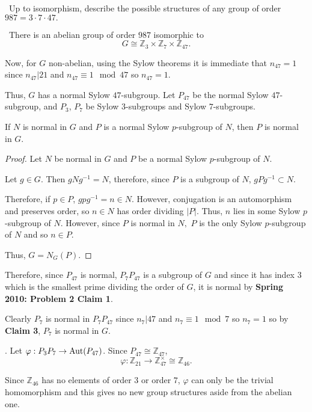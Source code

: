 \documentclass[12pt]{Qual}
\begin{document}
\begin{problem} $\,$
Up to isomorphism, describe the possible structures of any group of order $987=3\cdot 7\cdot 47.$
\end{problem}


\begin{solution}$\,$
 There is an abelian group of order $987$ isomorphic to $$G\cong\mathbb{Z}_3\times\mathbb{Z}_7\times\mathbb{Z}_{47}.$$

Now, for $G$ non-abelian, using the Sylow theorems it is immediate that $n_{47}=1$ since $n_{47}|21$ and $n_{47}\equiv 1\mod 47$ so $n_{47}=1$.

Thus, $G$ has a normal Sylow $47$-subgroup. Let $P_{47}$ be the normal Sylow $47$-subgroup, and $P_3$, $P_7$ be Sylow $3$-subgroups and Sylow $7$-subgroups.

\begin{claim} If $N$ is normal in $G$ and $P$ is a normal Sylow $p$-subgroup of $N$, then $P$ is normal in $G$.
\begin{proof} Let $N$ be normal in $G$ and $P$ be a normal Sylow $p$-subgroup of $N$.

Let $g\in G$. Then $gNg^{-1}=N$, therefore, since $P$ is a subgroup of $N$, $gPg^{-1}\subset N$.

Therefore, if $p\in P$, $gpg^{-1}=n\in N$. However, conjugation is an automorphism and preserves order, so $n\in N$ has order dividing $|P|$. Thus, $n$ lies in some Sylow $p$-subgroup of $N.$ However, since $P$ is normal in $N,$ $P$ is the only Sylow $p$-subgroup of $N$ and so $n\in P$.

Thus, $G=N_G(P)$.
\end{proof}
\end{claim}

Therefore, since $P_{47}$ is normal, $P_7P_{47}$ is a subgroup of $G$ and since it has index $3$ which is the smallest prime dividing the order of $G$, it is normal by \textbf{Spring 2010: Problem 2 Claim 1}.

Clearly $P_7$ is normal in $P_7P_{47}$ since $n_7|47$ and $n_7\equiv 1\mod 7$ so $n_7=1$ so by \textbf{Claim 3}, $P_7$ is normal in $G.$

. Let $\varphi:P_3P_7\to\text{Aut}(P_{47})$. Since $P_{47}\cong\mathbb{Z}_{47}$, $$\varphi:\mathbb{Z}_{21}\to\mathbb{Z}_{47}^\times\cong\mathbb{Z}_{46}.$$

Since $\mathbb{Z}_{46}$ has no elements of order $3$ or order $7$, $\varphi$ can only be the trivial homomorphism and this gives no new group structures aside from the abelian one.


\end{solution}
\end{document}
